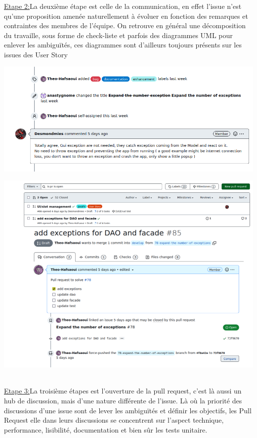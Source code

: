 \documentclass[a4paper,french,final]{memoir}
\begin{document}
\begin{minipage}{0.5\textwidth}
\underline{Etape 2:}La deuxième étape est celle de la communication, en effet l'issue n'est qu'une proposition amenée naturellement à évoluer en fonction des remarques et contraintes des membres de l'équipe. On retrouve en général une décomposition du travaille, sous forme de check-liste
et parfois des diagrammes UML pour enlever les ambiguïtés, ces diagrammes sont d'ailleurs toujours présents sur les issues des User Story
\end{minipage}
\begin{minipage}{0.5\textwidth}
\includegraphics[width=\textwidth]{figures/comment.png}

\end{minipage}

\begin{minipage}{0.5\textwidth}
\includegraphics[width=\textwidth]{figures/OpenPr.png}
\end{minipage}
\begin{minipage}{0.5\textwidth}
\vspace{2.5cm}\\
\underline{Etape 3:}La troisième étapes est l'ouverture de la pull request, c'est là aussi un hub de discussion, mais d'une nature différente de
l'issue. Là où la priorité des discussions d'une issue sont de lever les ambiguïtés et définir les objectifs, les Pull Request elle dans leurs
discussions se concentrent sur l'aspect technique, performance, lisibilité, documentation et bien sûr les tests unitaire.
\end{minipage}
\end{document}
